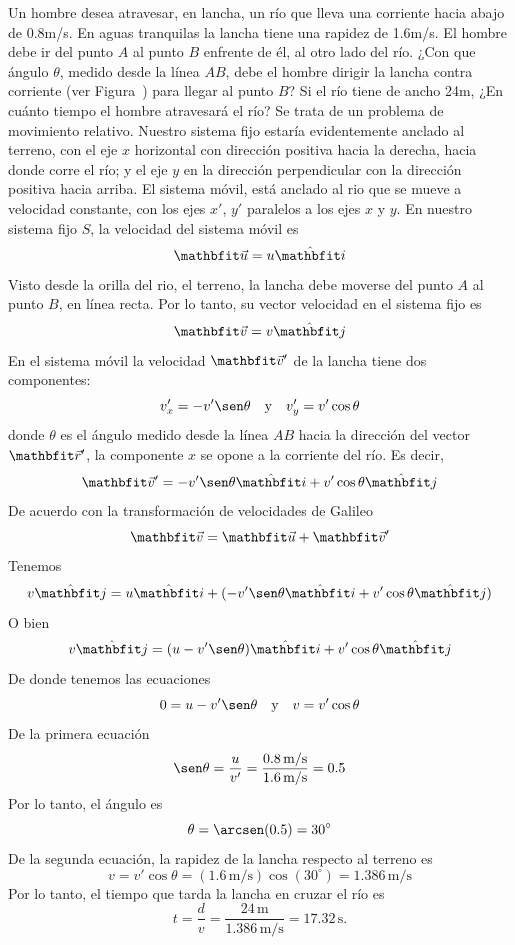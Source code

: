 \begin{example}{}{}
    Un hombre desea atravesar, en lancha, un río que lleva una corriente hacia abajo de 0.8m/s. En aguas tranquilas la lancha tiene una rapidez de 1.6m/s. El hombre debe ir del punto $A$ al punto $B$ enfrente de él, al otro lado del río. ¿Con que ángulo $\theta$, medido desde la línea $AB$, debe el hombre dirigir la lancha contra corriente (ver Figura~) para llegar al punto $B$? Si el río tiene de ancho 24m, ¿En cuánto tiempo el hombre atravesará el río?
    \vspace{2mm}
    \sol Se trata de un problema de movimiento relativo. Nuestro sistema fijo estaría evidentemente anclado al terreno, con el eje $x$ horizontal con dirección positiva hacia la derecha, hacia donde corre el río; y el eje $y$ en la dirección perpendicular con la dirección positiva hacia arriba. El sistema móvil, está anclado al rio que se mueve a velocidad constante, con los ejes $x'$, $y'$ paralelos a los ejes $x$ y $y$. En nuestro sistema fijo $S$, la velocidad del sistema móvil es
        $$\velou = u\veci$$
        Visto desde la orilla del rio, el terreno, la lancha debe moverse del punto $A$ al punto $B$, en línea recta. Por lo tanto, su vector velocidad en el sistema fijo es
        $$\veloi = v\vecj$$
        En el sistema móvil la velocidad $\veloi'$ de la lancha tiene dos componentes:
        $$v_x' = -v'\sen\theta \quad \text{y} \quad v_y' = v'\cos\theta$$
        donde $\theta$ es el ángulo medido desde la línea $AB$ hacia la dirección del vector $\vecr'$, la componente $x$ se opone a la corriente del río. Es decir,
        $$\veloi' = -v'\sen\theta\veci + v'\cos\theta\vecj$$
        De acuerdo con la transformación de velocidades de Galileo
        $$\veloi = \velou + \veloi'$$
        Tenemos
        $$v\vecj = u\veci + (-v'\sen\theta\veci + v'\cos\theta\vecj)$$
        O bien
        $$v\vecj = (u-v'\sen\theta)\veci + v'\cos\theta\vecj$$
        De donde tenemos las ecuaciones
        $$0 = u-v'\sen\theta \quad \text{y} \quad v = v'\cos\theta$$
        De la primera ecuación
        $$\sen\theta = \frac{u}{v'} = \frac{0.8\,\text{m/s}}{1.6\,\text{m/s}} = 0.5$$
        Por lo tanto, el ángulo es
        $$\theta = \arcsen(0.5) = 30^\circ$$
        De la segunda ecuación, la rapidez de la lancha respecto al terreno es
        $$v = v'\cos\theta = (1.6\,\text{m/s})\cos(30^\circ) = 1.386\,\text{m/s}$$
        Por lo tanto, el tiempo que tarda la lancha en cruzar el río es
        \begin{equation*}
            t = \frac{d}{v} = \frac{24\,\text{m}}{1.386\,\text{m/s}} = 17.32\,\text{s}. \tag*{\Square}
        \end{equation*}
\end{example}

